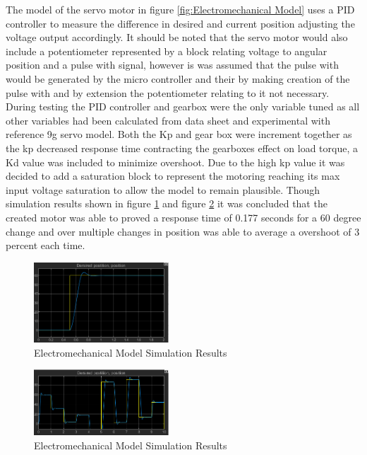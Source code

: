 The model of the servo motor in figure \ref{fig:Electromechanical Model} uses a PID controller to measure the difference in desired and current position adjusting the voltage output accordingly. It should be noted that the servo motor would also include a potentiometer represented by a block relating voltage to angular position and a pulse with signal, however is was assumed that the pulse with would be generated by the micro controller and their by making creation of the pulse with and by extension the potentiometer relating to it not necessary. During testing the PID controller and gearbox were the only variable tuned as all other variables had been calculated from data sheet and experimental with reference 9g servo model. Both the Kp and gear box were increment together as the kp decreased response time contracting the gearboxes effect on load torque, a Kd value was included to minimize overshoot. Due to the high kp value it was decided to add a saturation block to represent the motoring reaching its max input voltage saturation to allow the model to remain plausible. Though simulation results shown in figure \ref{fig:Electromechanical Model Simulation Results} and figure \ref{fig:Electromechanical Model Simulation varying input positions}  it was concluded that the created motor was able to proved a response time of 0.177 seconds for a 60 degree change and over multiple changes in position was able to average a overshoot of 3 percent each time. 
\begin{figure}[h]
 \centering
   \includegraphics[width = 0.45\textwidth]{figures/15.png}                \caption{Electromechanical Model Simulation Results}
   \label{fig:Electromechanical Model Simulation Results}
\end{figure}
\begin{figure}[h]
 \centering
   \includegraphics[width = 0.45\textwidth]{figures/16.png}                \caption{Electromechanical Model Simulation Results}
   \label{fig:Electromechanical Model Simulation varying input positions}
\end{figure}







